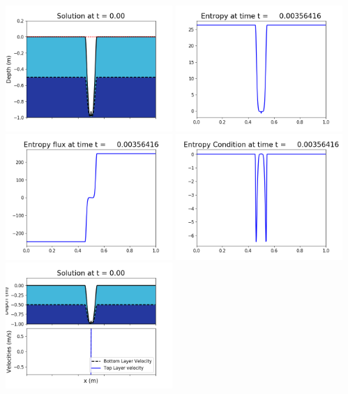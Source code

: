 \documentclass[11pt]{article}
\begin{document}
\includegraphics[width=0.475\textwidth]{frame0023fig1006.png}
\vskip 10pt 
\includegraphics[width=0.475\textwidth]{frame0023fig1007.png}
\includegraphics[width=0.475\textwidth]{frame0023fig1008.png}
\vskip 10pt 
\includegraphics[width=0.475\textwidth]{frame0023fig1009.png}
\vskip 10pt 
\includegraphics[width=0.475\textwidth]{frame0024fig1001.png}
\end{document}
